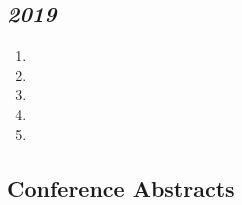 \documentclass{article}
\newcommand{\formattedsection}[1]{
    \begin{tcolorbox}[colback=gray!20,enhanced,sharp corners,frame hidden,halign=justify]
    \section*{#1}
    \end{tcolorbox}
}
\newcommand{\lastyear}{2010} %
\begin{document}
\subsection*{\textit{2019}}
\begin{enumerate}[resume]
    \item {}
    \item {}
    \item {}
    \item {}
    \item {}
\end{enumerate}
\fi
\ifdim \lastyear pt < 2018 pt
\subsection*{\textit{2017}}
\begin{enumerate}[resume]
    \item \bibentry{Lyle2017a}
\end{enumerate}
\fi
\ifdim \lastyear pt < 2016 pt
\subsection*{\textit{2015}}
\begin{enumerate}[resume]
    \item \bibentry{Charlton2015}
\end{enumerate}
\fi
\ifdim \lastyear pt < 2015 pt
\subsection*{\textit{2014}}
\begin{enumerate}[resume]
    \item \bibentry{Charlton2014}
    \item \bibentry{Charlton2014a}
\end{enumerate}
\fi
\ifdim \lastyear pt < 2012 pt
\subsection*{\textit{2012}}
\begin{enumerate}[resume]
    \item \bibentry{Orphanidou2011}
\end{enumerate}
\fi
  
  
\formattedsection{Conference Abstracts}
\end{document}
